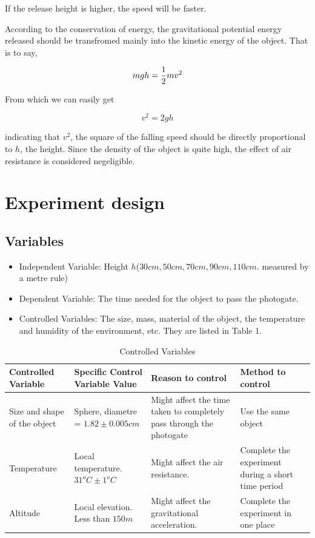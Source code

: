 \documentclass[a4paper]{article}
\begin{document}
If the release height is higher, the speed will be faster.

According to the conservation of energy, the gravitational potential energy released should be transfromed mainly into the kinetic energy of the object. That is to say,

$$mgh = {1\over 2} m v ^ 2$$

From which we can easily get 

$$v^2 = 2gh$$

indicating that $v^2$, the square of the falling speed should be directly proportional to $h$, the height. Since the density of the object is quite high, the effect of air resistance is considered negeligible.

\section{Experiment design}

\subsection{Variables}

\begin{itemize}
    \item Independent Variable: Height $h$($30cm,50cm,70cm,90cm,110cm$. measured by a metre rule)
    \item Dependent Variable: The time needed for the object to pass the photogate.
    \item Controlled Variables: The size, mass, material of the object, the temperature and humidity of the environment, etc. They are listed in Table 1.
\end{itemize}

\begin{table}[ht!]
    \centering
    \caption[short]{Controlled Variables}
    \begin{tabularx}{0.8 \textwidth}{|X|X|X|X|}
    \hline
    Controlled Variable          & Specific Control Variable Value      & Reason to control                                                    & Method to control                                  \\
    \hline
    Size and shape of the object & Sphere, diametre = $1.82\pm 0.005cm$ & Might affect the time taken to completely pass through the photogate & Use the same object                                \\
    \hline
    Temperature                  & Local temperature. $31^oC\pm 1^oC$   & Might affect the air resistance.                                     & Complete the experiment during a short time period \\
    \hline
    Altitude                     & Local elevation. Less than $150m$    & Might affect the gravitational acceleration.                         & Complete the experiment in one place              \\
    \hline
    \end{tabularx}
\end{table}
\end{document}
